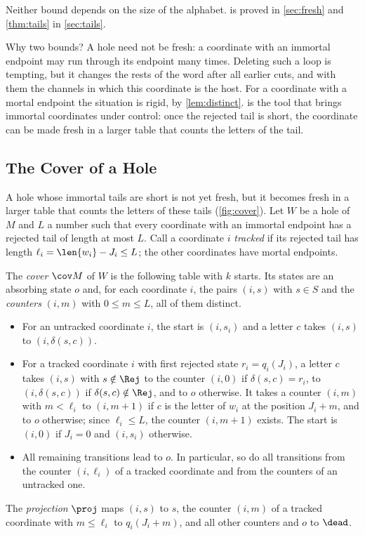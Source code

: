 Neither bound depends on the size of the alphabet.  is proved
in \cref{sec:fresh} and \cref{thm:tails} in \cref{sec:tails}.

Why two bounds? A hole need not be fresh: a coordinate with an immortal
endpoint may run through its endpoint many times. Deleting such a loop is
tempting, but it changes the rests of the word after all earlier cuts, and
with them the channels in which this coordinate is the host. For a
coordinate with a mortal endpoint the situation is rigid, by
\cref{lem:distinct}.  is the tool that brings immortal
coordinates under control: once the rejected tail is short, the coordinate
can be made fresh in a larger table that counts the letters of the tail.

\subsection{The Cover of a Hole}\label{sec:overview-cover}



A hole whose immortal tails are short is not yet fresh, but it becomes fresh
in a larger table that counts the letters of these tails
(\cref{fig:cover}). Let $W$ be a hole of $M$ and $L$ a number such that
every coordinate with an immortal endpoint has a rejected tail of length at
most $L$. Call a coordinate $i$ \emph{tracked} if its rejected tail has
length $\ell_i=\len{w_i}-J_i\le L$; the other coordinates have mortal
endpoints.

\begin{definition}\label{def:cover-hole}
The \emph{cover} $\cov M$ of $W$ is the following table with $k$ starts. Its
states are an absorbing state $o$ and, for each coordinate $i$, the pairs
$(i,s)$ with $s\in S$ and the \emph{counters} $(i,m)$ with $0\le m\le L$,
all of them distinct.
\begin{itemize}
\item For an untracked coordinate $i$, the start is $(i,s_i)$ and a letter
  $c$ takes $(i,s)$ to $(i,\delta(s,c))$.
\item For a tracked coordinate $i$ with first rejected state
  $r_i=q_i(J_i)$, a letter $c$ takes $(i,s)$ with $s\notin\Rej$ to the
  counter $(i,0)$ if $\delta(s,c)=r_i$, to $(i,\delta(s,c))$ if
  $\delta(s,c)\notin\Rej$, and to $o$ otherwise. It takes a counter $(i,m)$
  with $m<\ell_i$ to $(i,m+1)$ if $c$ is the letter of $w_i$ at the
  position $J_i+m$, and to $o$ otherwise; since $\ell_i\le L$, the counter
  $(i,m+1)$ exists. The start is $(i,0)$ if $J_i=0$ and $(i,s_i)$
  otherwise.
\item All remaining transitions lead to $o$. In particular, so do all
  transitions from the counter $(i,\ell_i)$ of a tracked coordinate and
  from the counters of an untracked one.
\end{itemize}
The \emph{projection} $\proj$ maps $(i,s)$ to $s$, the counter $(i,m)$ of a
tracked coordinate with $m\le\ell_i$ to $q_i(J_i+m)$, and all other counters
and $o$ to $\dead$.
\end{definition}


